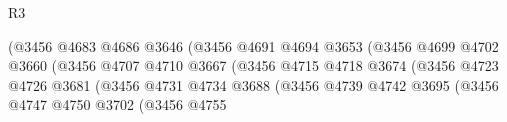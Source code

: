 \begin{lexlean}{R3}
\begin{coremodule}
                                                      (@3456
                                                        @4683
                                                        @4686
                                                        @3646
                                                        (@3456
                                                          @4691
                                                          @4694
                                                          @3653
                                                          (@3456
                                                            @4699
                                                            @4702
                                                            @3660
                                                            (@3456
                                                              @4707
                                                              @4710
                                                              @3667
                                                              (@3456
                                                                @4715
                                                                @4718
                                                                @3674
                                                                (@3456
                                                                  @4723
                                                                  @4726
                                                                  @3681
                                                                  (@3456
                                                                    @4731
                                                                    @4734
                                                                    @3688
                                                                    (@3456
                                                                      @4739
                                                                      @4742
                                                                      @3695
                                                                      (@3456
                                                                        @4747
                                                                        @4750
                                                                        @3702
                                                                        (@3456
                                                                          @4755

\end{coremodule}
\end{lexlean}

